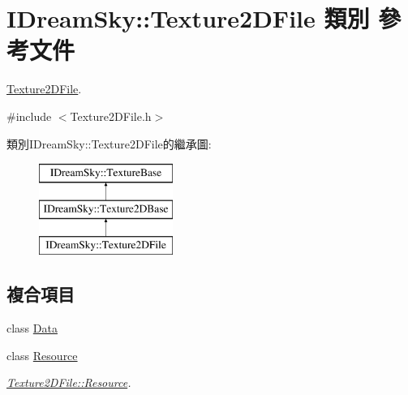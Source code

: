 \hypertarget{class_i_dream_sky_1_1_texture2_d_file}{}\section{I\+Dream\+Sky\+:\+:Texture2\+D\+File 類別 參考文件}
\label{class_i_dream_sky_1_1_texture2_d_file}


\hyperlink{class_i_dream_sky_1_1_texture2_d_file}{Texture2\+D\+File}.  




{\ttfamily \#include $<$Texture2\+D\+File.\+h$>$}

類別\+I\+Dream\+Sky\+:\+:Texture2\+D\+File的繼承圖\+:\begin{figure}[H]
\begin{center}
\leavevmode
\includegraphics[height=3.000000cm]{class_i_dream_sky_1_1_texture2_d_file}
\end{center}
\end{figure}
\subsection*{複合項目}
\begin{DoxyCompactItemize}
\item 
class \hyperlink{class_i_dream_sky_1_1_texture2_d_file_1_1_data}{Data}
\item 
class \hyperlink{class_i_dream_sky_1_1_texture2_d_file_1_1_resource}{Resource}
\begin{DoxyCompactList}\small\item\em \hyperlink{class_i_dream_sky_1_1_texture2_d_file_1_1_resource}{Texture2\+D\+File\+::\+Resource}. \end{DoxyCompactList}\end{DoxyCompactItemize}

